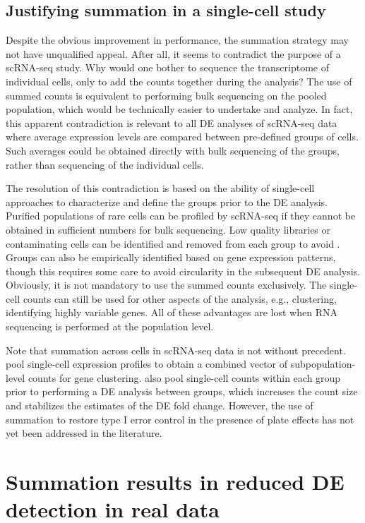 \documentclass[oupdraft]{bio}
\begin{document}
\subsection{Justifying summation in a single-cell study}
Despite the obvious improvement in performance, the summation strategy may not have unqualified appeal.
After all, it seems to contradict the purpose of a scRNA-seq study. 
Why would one bother to sequence the transcriptome of individual cells, only to add the counts together during the analysis?
The use of summed counts is equivalent to performing bulk sequencing on the pooled population, which would be technically easier to undertake and analyze.
In fact, this apparent contradiction is relevant to all DE analyses of scRNA-seq data where average expression levels are compared between pre-defined groups of cells.
Such averages could be obtained directly with bulk sequencing of the groups, rather than sequencing of the individual cells.

The resolution of this contradiction is based on the ability of single-cell approaches to characterize and define the groups prior to the DE analysis.
Purified populations of rare cells can be profiled by scRNA-seq if they cannot be obtained in sufficient numbers for bulk sequencing.
Low quality libraries or contaminating cells can be identified and removed from each group to avoid .
Groups can also be empirically identified based on gene expression patterns, though this requires some care to avoid circularity in the subsequent DE analysis.
Obviously, it is not mandatory to use the summed counts exclusively. 
The single-cell counts can still be used for other aspects of the analysis, e.g., clustering, identifying highly variable genes.
All of these advantages are lost when RNA sequencing is performed at the population level.

Note that summation across cells in scRNA-seq data is not without precedent.
\cite{jaitin2014massively} pool single-cell expression profiles to obtain a combined vector of subpopulation-level counts for gene clustering.
\cite{klein2015droplet} also pool single-cell counts within each group prior to performing a DE analysis between groups,
    which increases the count size and stabilizes the estimates of the DE fold change.
However, the use of summation to restore type I error control in the presence of plate effects has not yet been addressed in the literature.

\section{Summation results in reduced DE detection in real data}
\end{document}
